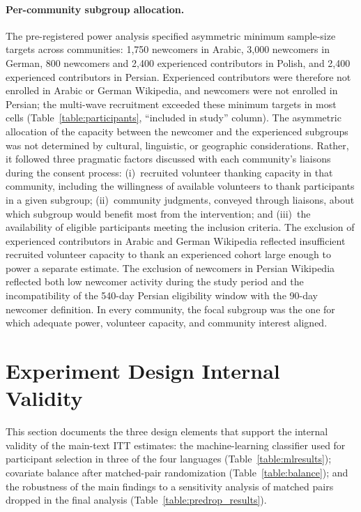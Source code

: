 \documentclass[9pt,twoside,lineno]{pnas-new}
\begin{document}
\paragraph{Per-community subgroup allocation.} The pre-registered power analysis specified asymmetric minimum sample-size targets across communities: 1{,}750 newcomers in Arabic, 3{,}000 newcomers in German, 800 newcomers and 2{,}400 experienced contributors in Polish, and 2{,}400 experienced contributors in Persian. Experienced contributors were therefore not enrolled in Arabic or German Wikipedia, and newcomers were not enrolled in Persian; the multi-wave recruitment exceeded these minimum targets in most cells (Table~\ref{table:participants}, ``included in study'' column). The asymmetric allocation of the capacity between the newcomer and the experienced subgroups was not determined by cultural, linguistic, or geographic considerations. Rather, it followed three pragmatic factors discussed with each community's liaisons during the consent process: (i)~recruited volunteer thanking capacity in that community, including the willingness of available volunteers to thank participants in a given subgroup; (ii)~community judgments, conveyed through liaisons, about which subgroup would benefit most from the intervention; and (iii)~the availability of eligible participants meeting the inclusion criteria. The exclusion of experienced contributors in Arabic and German Wikipedia reflected insufficient recruited volunteer capacity to thank an experienced cohort large enough to power a separate estimate. The exclusion of newcomers in Persian Wikipedia reflected both low newcomer activity during the study period and the incompatibility of the 540-day Persian eligibility window with the 90-day newcomer definition. In every community, the focal subgroup was the one for which adequate power, volunteer capacity, and community interest aligned.

\section*{Experiment Design Internal Validity}
This section documents the three design elements that support the internal validity of the main-text ITT estimates: the machine-learning classifier used for participant selection in three of the four languages (Table~\ref{table:mlresults}); covariate balance after matched-pair randomization (Table~\ref{table:balance}); and the robustness of the main findings to a sensitivity analysis of matched pairs dropped in the final analysis (Table~\ref{table:predrop_results}).
\end{document}
